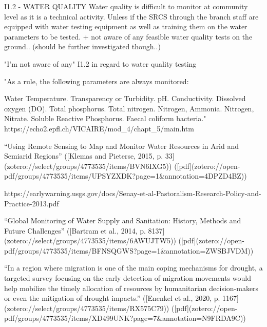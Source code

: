 I1.2
- WATER QUALITY
Water quality is difficult to monitor at community level as it is a technical activity. Unless if the SRCS through the branch staff are equipped with water testing equipment as well as training them on the water parameters to be tested.
+ not aware of any feasible water quality tests on the ground.. (should be further investigated though..)

"I'm not aware of any" I1.2 in regard to water quality testing


"As a rule, the following parameters are always monitored:

Water Temperature.
Transparency or Turbidity.
pH.
Conductivity.
Dissolved oxygen (DO).
Total phosphorus.
Total nitrogen.
Nitrogen, Ammonia.
Nitrogen, Nitrate.
Soluble Reactive Phosphorus.
Faecal coliform bacteria." https://echo2.epfl.ch/VICAIRE/mod_4/chapt_5/main.htm


“Using Remote Sensing to Map and Monitor Water Resources in Arid and Semiarid Regions” ([Klemas and Pieterse, 2015, p. 33](zotero://select/groups/4773535/items/BVN6IXG5)) ([pdf](zotero://open-pdf/groups/4773535/items/UPSYZXDK?page=1&annotation=4DPZD4BZ))

https://earlywarning.usgs.gov/docs/Senay-et-al-Pastoralism-Research-Policy-and-Practice-2013.pdf


“Global Monitoring of Water Supply and Sanitation: History, Methods and Future Challenges” ([Bartram et al., 2014, p. 8137](zotero://select/groups/4773535/items/6AWUJTW5)) ([pdf](zotero://open-pdf/groups/4773535/items/BFNSQGWS?page=1&annotation=ZWSBJVDM))

“In a region where migration is one of the main coping mechanisms for drought, a targeted survey focusing on the early detection of migration movements would help mobilize the timely allocation of resources by humanitarian decision-makers or even the mitigation of drought impacts.” ([Enenkel et al., 2020, p. 1167](zotero://select/groups/4773535/items/RX575C79)) ([pdf](zotero://open-pdf/groups/4773535/items/XD499UNK?page=7&annotation=N9FRDA9C))

